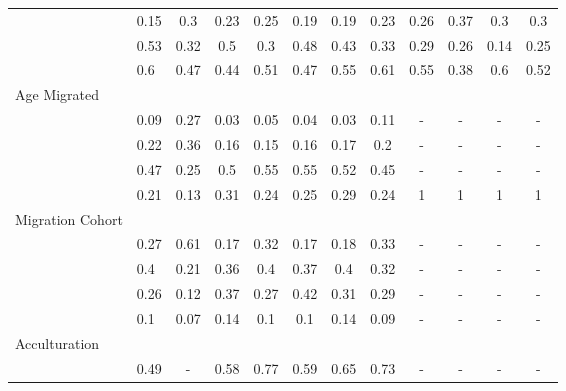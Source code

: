 \begin{table}[ht]
\begin{tabular}{>{\raggedright\arraybackslash}p{3.2cm}|lcccccc|cccc}
  \multicolumn{1}{>{\raggedleft\arraybackslash}p{2.2cm}|}{\makebox[2.2cm][r]{Lives Alone }}& 0.15 & 0.3 & 0.23 & 0.25 & 0.19 & 0.19 & 0.23 & 0.26 & 0.37 & 0.3 & 0.3 \\ 
  \multicolumn{1}{>{\raggedleft\arraybackslash}p{2.9cm}|}{\makebox[2.9cm][r]{Lives with Child }}& 0.53 & 0.32 & 0.5 & 0.3 & 0.48 & 0.43 & 0.33 & 0.29 & 0.26 & 0.14 & 0.25 \\ 
  \multicolumn{1}{>{\raggedleft\arraybackslash}p{3.4cm}|}{\makebox[3.4cm][r]{Married/Cohabiting }}& 0.6 & 0.47 & 0.44 & 0.51 & 0.47 & 0.55 & 0.61 & 0.55 & 0.38 & 0.6 & 0.52 \\ 
  Age Migrated &  &  &  &  &  &  &  &  &  &  &  \\ 
  \multicolumn{1}{>{\raggedleft\arraybackslash}p{2.4cm}|}{\makebox[2.4cm][r]{Less than 15 }}& 0.09 & 0.27 & 0.03 & 0.05 & 0.04 & 0.03 & 0.11 & - & - & - & - \\ 
  \multicolumn{1}{>{\raggedleft\arraybackslash}p{1.6cm}|}{\makebox[1.6cm][r]{15 - 24 }}& 0.22 & 0.36 & 0.16 & 0.15 & 0.16 & 0.17 & 0.2 & - & - & - & - \\ 
  \multicolumn{1}{>{\raggedleft\arraybackslash}p{1.6cm}|}{\makebox[1.6cm][r]{25 - 49 }}& 0.47 & 0.25 & 0.5 & 0.55 & 0.55 & 0.52 & 0.45 & - & - & - & - \\ 
  \multicolumn{1}{>{\raggedleft\arraybackslash}p{2.6cm}|}{\makebox[2.6cm][r]{50 and Above }}& 0.21 & 0.13 & 0.31 & 0.24 & 0.25 & 0.29 & 0.24 & 1 & 1 & 1 & 1 \\ 
  Migration Cohort &  &  &  &  &  &  &  &  &  &  &  \\ 
  \multicolumn{1}{>{\raggedleft\arraybackslash}p{2.3cm}|}{\makebox[2.3cm][r]{Before 1965 }}& 0.27 & 0.61 & 0.17 & 0.32 & 0.17 & 0.18 & 0.33 & - & - & - & - \\ 
  \multicolumn{1}{>{\raggedleft\arraybackslash}p{2.2cm}|}{\makebox[2.2cm][r]{1965 - 1979 }}& 0.4 & 0.21 & 0.36 & 0.4 & 0.37 & 0.4 & 0.32 & - & - & - & - \\ 
  \multicolumn{1}{>{\raggedleft\arraybackslash}p{2.2cm}|}{\makebox[2.2cm][r]{1980 - 1999 }}& 0.26 & 0.12 & 0.37 & 0.27 & 0.42 & 0.31 & 0.29 & - & - & - & - \\ 
  \multicolumn{1}{>{\raggedleft\arraybackslash}p{2.1cm}|}{\makebox[2.1cm][r]{After 1999 }}& 0.1 & 0.07 & 0.14 & 0.1 & 0.1 & 0.14 & 0.09 & - & - & - & - \\ 
  Acculturation &  &  &  &  &  &  &  &  &  &  &  \\ 
  \multicolumn{1}{>{\raggedleft\arraybackslash}p{1.6cm}|}{\makebox[1.6cm][r]{Citizen }}& 0.49 & - & 0.58 & 0.77 & 0.59 & 0.65 & 0.73 & - & - & - & - \\ 

\end{tabular}
\end{table}
